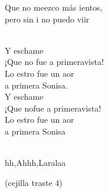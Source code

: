 \documentclass[12pt]{article}
\begin{document}
\begin{multicols*}{2}
\begin{cancion}
                        Que no meezco más ientos, \\
                        pero sin i no puedo viir\\\jump\\
                        \begin{chorus}%
                        Y eschame  \\
                        ¡Que no fue a primeravista!\\
                        Lo estro fue un aor \\
                        a primera Sonisa.\\
                \jump
                        Y eschame  \\
                        ¡Que nofue a primeravista!\\
                        Lo estro fue un aor \\
                        a primera Sonisa\\
                        \end{chorus}%
                        \jump\\
                        hh,Ahhh,Laralaa           \\
                \end{cancion}%

                \newpage
        
                \begin{cancion}%
                        (cejilla traste 4)


\end{cancion}
\end{multicols*}
\end{document}
